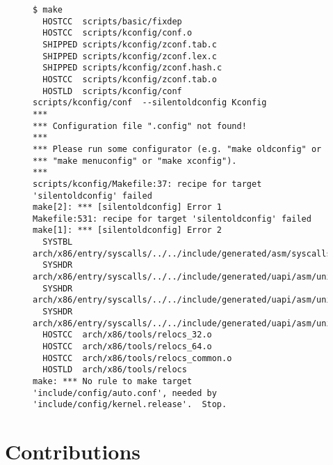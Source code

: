 \documentclass[a4paper]{article}
\begin{document}
\begin{figure}
\begin{verbatim}
$ make
  HOSTCC  scripts/basic/fixdep
  HOSTCC  scripts/kconfig/conf.o
  SHIPPED scripts/kconfig/zconf.tab.c
  SHIPPED scripts/kconfig/zconf.lex.c
  SHIPPED scripts/kconfig/zconf.hash.c
  HOSTCC  scripts/kconfig/zconf.tab.o
  HOSTLD  scripts/kconfig/conf
scripts/kconfig/conf  --silentoldconfig Kconfig
***
*** Configuration file ".config" not found!
***
*** Please run some configurator (e.g. "make oldconfig" or
*** "make menuconfig" or "make xconfig").
***
scripts/kconfig/Makefile:37: recipe for target 'silentoldconfig' failed
make[2]: *** [silentoldconfig] Error 1
Makefile:531: recipe for target 'silentoldconfig' failed
make[1]: *** [silentoldconfig] Error 2
  SYSTBL  arch/x86/entry/syscalls/../../include/generated/asm/syscalls_32.h
  SYSHDR  arch/x86/entry/syscalls/../../include/generated/uapi/asm/unistd_32.h
  SYSHDR  arch/x86/entry/syscalls/../../include/generated/uapi/asm/unistd_64.h
  SYSHDR  arch/x86/entry/syscalls/../../include/generated/uapi/asm/unistd_x32.h
  HOSTCC  arch/x86/tools/relocs_32.o
  HOSTCC  arch/x86/tools/relocs_64.o
  HOSTCC  arch/x86/tools/relocs_common.o
  HOSTLD  arch/x86/tools/relocs
make: *** No rule to make target 'include/config/auto.conf', needed by 'include/config/kernel.release'.  Stop.
\end{verbatim}
\caption{}
\end{figure}

\clearpage
\appendix

\section{Contributions}

\clearpage
\listoffigures

\clearpage
\listoftables
\end{document}
